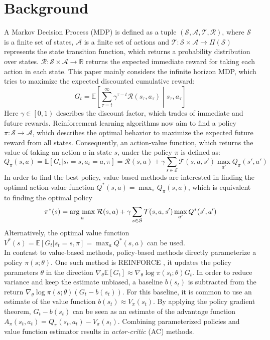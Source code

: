     \section{Background\label{sec:background}}
    A Markov Decision Process (MDP) is defined as a tuple $(\mathcal{S}, \mathcal{A}, \mathcal{T},\mathcal{R})$, where $\mathcal{S}$ is a finite set of states, $\mathcal{A}$ is a finite set of actions and $\mathcal{T}:\mathcal{S} \times \mathcal{A} \rightarrow \Pi(\mathcal{S})$ represents the state transition function, which returns a probability distribution over states.
    $\mathcal{R}:\mathcal{S} \times \mathcal{A} \rightarrow \mathbb{R}$ returns the expected immediate reward for taking each action in each state. 
    This paper mainly considers the infinite horizon MDP, which tries to maximize the expected discounted cumulative reward:
    \[
    G_t = \mathbb{E} \left[ \sum_{\tau=t}^{\infty} \gamma^{\tau-t} \mathcal{R}(s_\tau,a_\tau)\middle|s_\tau,a_\tau \right]
	\]
    Here $\gamma \in \left[0,1\right)$ describes the discount factor, which trades of immediate and future rewards.
    Reinforcement learning algorithms now aim to find a policy $\pi:\mathcal{S} \rightarrow \mathcal{A}$, which describes the optimal behavior to maximize the expected future reward from all states.
    Consequently, an action-value function, which returns the value of taking an action $a$ in state $s$, under the policy $\pi$ is defined as:
    \[
    Q_\pi(s,a) = \mathbb{E}\left[G_t|s_t =s,a_t=a,\pi\right] = \mathcal{R}(s,a) + \gamma \sum_{s\in\mathcal{S}}\mathcal{T}(s,a,s') \max_{a'}Q_\pi(s',a')
	\]
    In order to find the best policy, value-based methods are interested in finding the optimal action-value function $Q^*(s,a) =\max_\pi Q_\pi(s,a)$, which is equivalent to finding the optimal policy 
    \[
	\pi^*(s) = \underset{a}{\operatorname{arg}\,\operatorname{max}}\; \mathcal{R}(s,a) + \gamma \sum_{s\in\mathcal{S}}\mathcal{T}(s,a,s') \max_{a'}Q^*(s',a')
    \]
    Alternatively, the optimal value function $V^*(s) = \mathbb{E}\left[G_t|s_t=s, \pi\right] = \max_{a} Q^*(s,a)$ can be used.\\
    In contrast to value-based methods, policy-based methods directly parameterize a policy $\pi(s;\theta)$. 
    One such method is REINFORCE \cite{Williams1992}, it updates the policy parameters $\theta$ in the direction $\nabla_\theta \mathbb{E}[G_t]\approx \nabla_\theta\log\pi(s_t;\theta)G_t$.
    In order to reduce variance and keep the estimate unbiased, a baseline $b(s_t)$ is subtracted from the return $\nabla_\theta\log\pi(s;\theta)(G_t - b(s_t))$. 
    For this baseline, it is common to use an estimate of the value function $b(s_t)\approx V_\pi(s_t)$.
    By applying the policy gradient theorem, $G_t-b(s_t)$ can be seen as an estimate of the advantage function $A_\pi(s_t,a_t) = Q_\pi(s_t,a_t) - V_\pi(s_t)$.
    Combining parameterized policies and value function estimator results in \textit{actor-critic} (AC) methods. 
    
